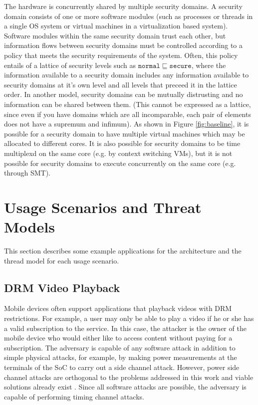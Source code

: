     The hardware is concurrently shared by multiple security domains. A 
    security domain consists of one or more software modules (such as processes 
    or threads in a single OS system or virtual machines in a virtualization 
    based system). Software modules within the same security domain trust each 
    other, but information flows between security domains must be controlled 
    according to a policy that meets the security requirements of the system.
    Often, this policy entails of a lattice of security levels such as 
    $\mathtt{normal} \sqsubseteq \mathtt{secure}$, where the information 
    available to a security domain includes any information available to 
    security domains at it's own level and all levels that preceed it in the 
    lattice order.  In another model, security domains can be mutually 
    distrusting and no information can be shared between them. (This cannot be 
    expressed as a lattice, since even if you have domains which are all 
    incomparable, each pair of elements does not have a supremum and infimum). 
    As shown in Figure \ref{fig:baseline}, it is possible for a security domain 
    to have multiple virtual machines which may be allocated to different 
    cores. It is also possible for security domains to be time multiplexd on 
    the same core (e.g.  by context switching VMs), but it is not possible for 
    security domains to execute concurrently on the same core (e.g. through 
    SMT).

\section{Usage Scenarios and Threat Models}

    This section describes some example applications for the architecture and 
    the thread model for each usage scenario.

    \subsection{DRM Video Playback}
    Mobile devices often support applications that playback videos with
    DRM restrictions. For example, a user may only be able to play a video if 
    he or she has a valid subscription to the service. In this case, the 
    attacker is the owner of the mobile device who would either like to access 
    content without paying for a subscription. The adversary is capable of any 
    software attack in addition to simple physical attacks, for example, by 
    making power measurements at the terminals of the SoC to carry out a side 
    channel attack. However, power side channel attacks are orthogonal to the 
    problems addressed in this work and viable solutions already exist 
    \cite{needed}. Since all software attacks are possible, the adversary is 
    capable of performing timing channel attacks. 

